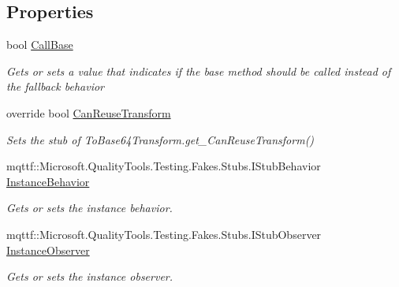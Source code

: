 \subsection*{Properties}
\begin{DoxyCompactItemize}
\item 
bool \hyperlink{class_system_1_1_security_1_1_cryptography_1_1_fakes_1_1_stub_to_base64_transform_a846392a45174c93bb6aec81f8bca1aac}{Call\-Base}
\begin{DoxyCompactList}\small\item\em Gets or sets a value that indicates if the base method should be called instead of the fallback behavior\end{DoxyCompactList}\item 
override bool \hyperlink{class_system_1_1_security_1_1_cryptography_1_1_fakes_1_1_stub_to_base64_transform_a55772ee564cb90d424f10651634bdba3}{Can\-Reuse\-Transform}
\begin{DoxyCompactList}\small\item\em Sets the stub of To\-Base64\-Transform.\-get\-\_\-\-Can\-Reuse\-Transform()\end{DoxyCompactList}\item 
mqttf\-::\-Microsoft.\-Quality\-Tools.\-Testing.\-Fakes.\-Stubs.\-I\-Stub\-Behavior \hyperlink{class_system_1_1_security_1_1_cryptography_1_1_fakes_1_1_stub_to_base64_transform_adc2c4215c2838818ef32f1ff12bae86a}{Instance\-Behavior}
\begin{DoxyCompactList}\small\item\em Gets or sets the instance behavior.\end{DoxyCompactList}\item 
mqttf\-::\-Microsoft.\-Quality\-Tools.\-Testing.\-Fakes.\-Stubs.\-I\-Stub\-Observer \hyperlink{class_system_1_1_security_1_1_cryptography_1_1_fakes_1_1_stub_to_base64_transform_a66daf55e5237c270a3a15d5df561acdb}{Instance\-Observer}
\begin{DoxyCompactList}\small\item\em Gets or sets the instance observer.\end{DoxyCompactList}\end{DoxyCompactItemize}


